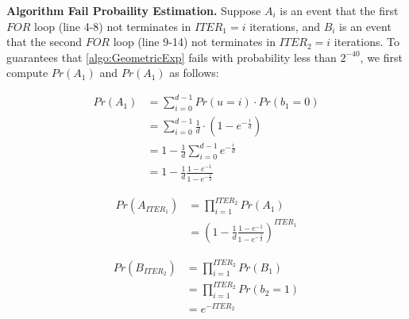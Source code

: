 
    \textbf{Algorithm Fail Probaility Estimation. }
    Suppose $A_i$ is an event that the first $FOR$ loop (line 4-8) not terminates in $ITER_1=i$ iterations, and $B_i$ is an event that the second $FOR$ loop (line 9-14) not terminates in $ITER_2=i$ iterations.
    To guarantees that \autoref{algo:GeometricExp} fails with probability less than $2^{-40}$, we first compute $Pr\left(A_1\right)$ and $Pr\left(A_1\right)$ as follows:



    \begin{equation}
        \begin{split}
            Pr\left(A_1\right) &= \sum_{i=0 }^{d-1}Pr\left(u=i\right) \cdot Pr\left(b_1=0\right) \\
            &= \sum_{i=0 }^{d-1}\frac{1}{d} \cdot \left(1-e^{-\frac{i}{d}}\right) \\
            &=1-\frac{1}{d}\sum_{i=0 }^{d-1}e^{-\frac{i}{d}}\\
            &=1-\frac{1}{d}\frac{1-e^{-1}}{1-e^{-\frac{1}{d}}}
        \end{split}
    \end{equation}

    \begin{equation}
        \begin{split}
            Pr\left(A_{ITER_1}\right) &= \prod_{i=1}^{ITER_2}Pr\left(A_1\right) \\
            &=\left(1-\frac{1}{d}\frac{1-e^{-1}}{1-e^{-\frac{1}{d}}}\right) ^{ITER_1}
        \end{split}
    \end{equation}

    \begin{equation}
        \begin{split}
            Pr\left(B_{ITER_2}\right) &= \prod_{i=1}^{ITER_2}Pr\left(B_1\right) \\
            &= \prod_{i=1}^{ITER_2}Pr\left(b_2=1\right) \\
            &=e^{- ITER_2 }
        \end{split}
    \end{equation}

